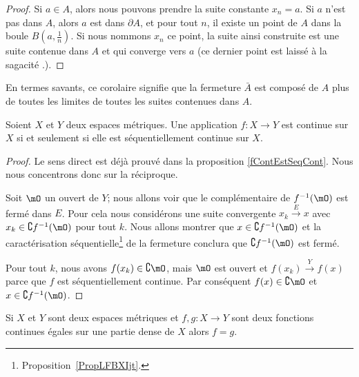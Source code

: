 \begin{proof}
    Si $a\in A$, alors nous pouvons prendre la suite constante $x_n=a$. Si $a$ n'est pas dans $A$, alors $a$ est dans $\partial A$, et pour tout $n$, il existe un point de $A$ dans la boule $B(a,\frac{1}{ n })$. Si nous nommons $x_n$ ce point, la suite ainsi construite est une suite contenue dans $A$ et qui converge vers $a$ (ce dernier point est laissé à la sagacité .).
\end{proof}

En termes savants, ce corolaire signifie que la fermeture $\bar A$ est composé de $A$ plus de toutes les limites de toutes les suites contenues dans $A$.

\begin{proposition}     \label{PropXIAQSXr}
    Soient \( X\) et \( Y\) deux espaces métriques. Une application \( f\colon X\to Y\) est continue sur \( X\) si et seulement si elle est séquentiellement continue sur \( X\).
\end{proposition}

\begin{proof}
    Le sens direct est déjà prouvé dans la proposition \ref{fContEstSeqCont}. Nous nous concentrons donc sur la réciproque.

    Soit \( \mO\) un ouvert de \( Y\); nous allons voir que le complémentaire de \( f^{-1}(\mO)\) est fermé dans \( E\). Pour cela nous considérons une suite convergente \( x_k\stackrel{E}{\longrightarrow} x\) avec \( x_k\in\complement f^{-1}(\mO)\) pour tout \( k\). Nous allons montrer que \( x\in \complement f^{-1}(\mO)\) et la caractérisation séquentielle\footnote{Proposition~\ref{PropLFBXIjt}.} de la fermeture conclura que \( \complement f^{-1}(\mO)\) est fermé.

    Pour tout \( k\), nous avons \( f(x_k)\in\complement \mO\), mais \( \mO\) est ouvert et \( f(x_k)\stackrel{Y}{\longrightarrow}f(x)\) parce que \( f\) est séquentiellement continue. Par conséquent \( f(x)\in\complement \mO\) et \( x\in\complement f^{-1}(\mO)\).
\end{proof}


\begin{proposition} \label{PropCJGIooZNpnGF}
    Si \( X\) et \( Y\) sont deux espaces métriques et \( f,g\colon X\to Y\) sont deux fonctions continues égales sur une partie dense de \( X\) alors \( f=g\).
\end{proposition}

